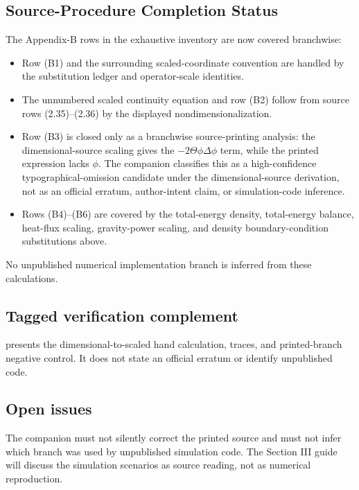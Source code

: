 \subsection*{Source-Procedure Completion Status}

The Appendix-B rows in the exhaustive inventory are now covered branchwise:
\begin{itemize}
\item Row (B1) and the surrounding scaled-coordinate convention are
  handled by the substitution ledger and operator-scale identities.
\item The unnumbered scaled continuity equation and row (B2) follow from
  source rows (2.35)--(2.36) by the displayed
  nondimensionalization.
\item Row (B3) is closed only as a branchwise source-printing analysis:
  the dimensional-source scaling gives the \(-2\Theta\phi\Delta\phi\) term,
  while the printed expression lacks \(\phi\).  The companion classifies this
  as a high-confidence typographical-omission candidate under the
  dimensional-source derivation, not as an official erratum, author-intent
  claim, or simulation-code inference.
\item Rows (B4)--(B6) are covered by the total-energy density,
  total-energy balance, heat-flux scaling, gravity-power scaling, and density
  boundary-condition substitutions above.
\end{itemize}
No unpublished numerical implementation branch is inferred from these
calculations.

\subsection*{Tagged verification complement}

 presents the
dimensional-to-scaled hand calculation, traces, and printed-branch negative
control. It does not state an official erratum or identify unpublished code.

\subsection*{Open issues}

The companion must not silently correct the printed source and must not infer
which branch was used by unpublished simulation code.  The Section III guide
will discuss the simulation scenarios as source reading, not as numerical
reproduction.
